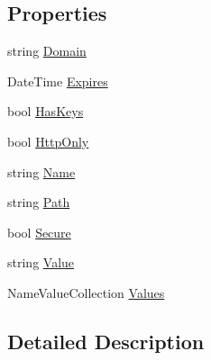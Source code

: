 \subsection*{Properties}
\begin{DoxyCompactItemize}
\item 
string \hyperlink{class_p_http_1_1_http_cookie_a8565baef8b0d7b2de58a8a3e6d702a7a}{Domain}
\item 
Date\+Time \hyperlink{class_p_http_1_1_http_cookie_ab11fb0349fdde2fcb039a6d10c65f614}{Expires}
\item 
bool \hyperlink{class_p_http_1_1_http_cookie_a5805ca0865cf72a6282c735dc6f6c8eb}{Has\+Keys}
\item 
bool \hyperlink{class_p_http_1_1_http_cookie_ad0de704fae5b7494ee1cff99fc863361}{Http\+Only}
\item 
string \hyperlink{class_p_http_1_1_http_cookie_ae6c77249f533c8e4b53a26165f0be55e}{Name}
\item 
string \hyperlink{class_p_http_1_1_http_cookie_ac8746ae5d7c6da78d72016a2a5a700e2}{Path}
\item 
bool \hyperlink{class_p_http_1_1_http_cookie_a6e1d24fd4dfc9139748a0539c35530b6}{Secure}
\item 
string \hyperlink{class_p_http_1_1_http_cookie_a5150d3fe06d8de573983e4528d9929e3}{Value}
\item 
Name\+Value\+Collection \hyperlink{class_p_http_1_1_http_cookie_a0fba6732ef9272cc5785ed55589b3134}{Values}
\end{DoxyCompactItemize}


\subsection{Detailed Description}



